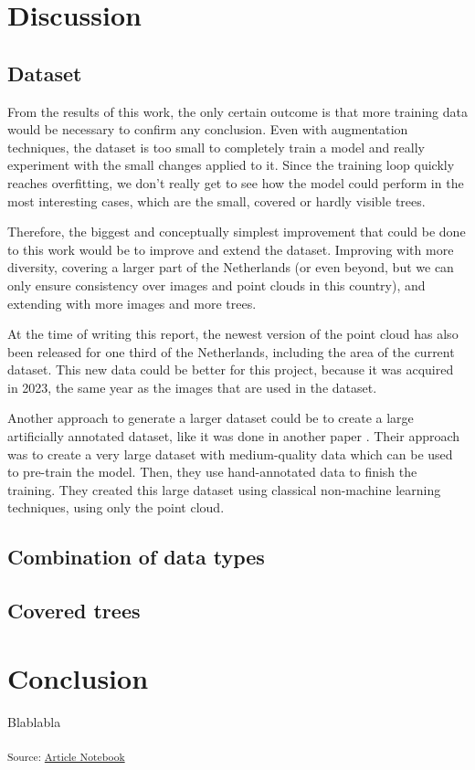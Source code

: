 \documentclass[
  letterpaper,
  DIV=11,
  numbers=noendperiod]{scrartcl}
\begin{document}
\section{Discussion}\label{discussion}

\subsection{Dataset}\label{dataset}

From the results of this work, the only certain outcome is that more
training data would be necessary to confirm any conclusion. Even with
augmentation techniques, the dataset is too small to completely train a
model and really experiment with the small changes applied to it. Since
the training loop quickly reaches overfitting, we don't really get to
see how the model could perform in the most interesting cases, which are
the small, covered or hardly visible trees.

Therefore, the biggest and conceptually simplest improvement that could
be done to this work would be to improve and extend the dataset.
Improving with more diversity, covering a larger part of the Netherlands
(or even beyond, but we can only ensure consistency over images and
point clouds in this country), and extending with more images and more
trees.

At the time of writing this report, the newest version of the point
cloud has also been released for one third of the Netherlands, including
the area of the current dataset. This new data could be better for this
project, because it was acquired in 2023, the same year as the images
that are used in the dataset.

Another approach to generate a larger dataset could be to create a large
artificially annotated dataset, like it was done in another paper
\autocite{DeepForest}. Their approach was to create a very large dataset
with medium-quality data which can be used to pre-train the model. Then,
they use hand-annotated data to finish the training. They created this
large dataset using classical non-machine learning techniques, using
only the point cloud.

\subsection{Combination of data types}\label{combination-of-data-types}

\subsection{Covered trees}\label{covered-trees}

\section*{Conclusion}\label{conclusion}

Blablabla

\textsubscript{Source:
\href{https://ZokszY.github.io/Geodan-internship-report/index.qmd.html}{Article
Notebook}}


\printbibliography[title=Bibliography]
\end{document}
